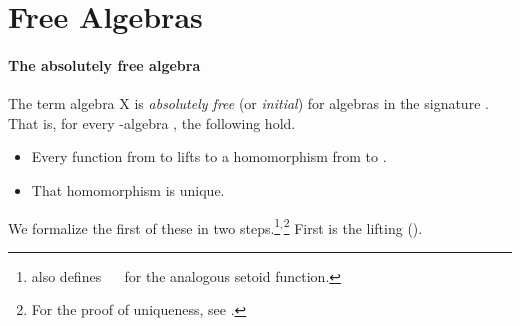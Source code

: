 
\section{Free Algebras}
\label{free-algebras}
\paragraph*{The absolutely free algebra}
The term algebra  \ab X is \emph{absolutely free} (or \emph{initial}) for algebras
in the signature . That is, for every -algebra , the following hold.
\begin{itemize}
\item Every function from  to  lifts to a homomorphism from   to .
\item That homomorphism is unique.
\end{itemize}
We formalize the first of these in two steps.\footnote{\agdaalgebras also defines
  \as{:} ~~
 for the analogous setoid function.}$^,$\footnote{For the proof of uniqueness,
see .}  First is the lifting ().
